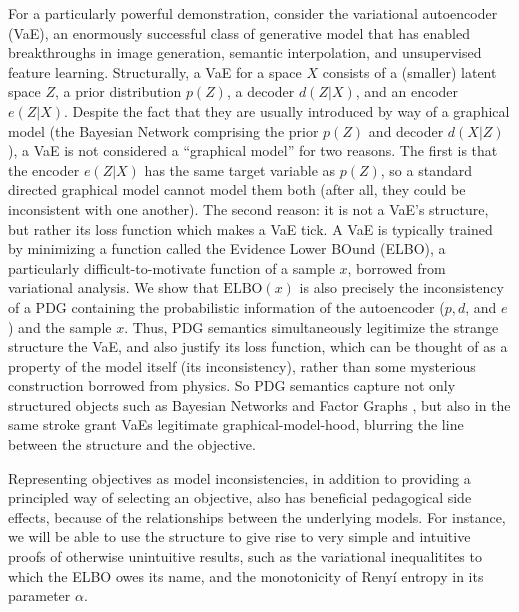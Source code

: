 \documentclass{article}
\theoremstyle{plain}
\theoremstyle{definition}
\begin{document}
For a particularly powerful demonstration, consider the variational autoencoder (VaE), an enormously successful class of generative model that has enabled breakthroughs in image generation, semantic interpolation, and unsupervised feature learning.
Structurally, a VaE for a space $X$ consists of a (smaller) latent space $Z$, a prior distribution $p(Z)$, a decoder $d(Z | X)$, and an encoder $e(Z| X)$.
Despite the fact that they are usually introduced by way of a graphical model (the Bayesian Network 
comprising the prior $p(Z)$ and decoder $d(X|Z)$), a VaE is not considered a ``graphical model'' for two reasons. 
The first is that the encoder $e(Z|X)$ has the same target variable as $p(Z)$, so a standard directed graphical model cannot model them both (after all, they could be inconsistent with one another). 
The second reason: it is not a VaE's structure, but rather its loss function which makes a VaE tick. A VaE is typically trained by minimizing a function called the Evidence Lower BOund (ELBO), a particularly difficult-to-motivate function of a sample $x$, borrowed from variational analysis. 
We show that $\mathrm{ELBO}(x)$ is also precisely the inconsistency of a PDG containing the probabilistic information of the autoencoder ($p, d$, and $e$) and the sample $x$. 
Thus, PDG semantics simultaneously legitimize the strange structure the VaE, and also justify its loss function, which can be thought of as a property of the model itself (its inconsistency), rather than some mysterious construction borrowed from physics.
So PDG semantics capture not only structured objects such as Bayesian Networks and Factor Graphs \cite{richardson2020probabilistic}, but also in the same stroke grant VaEs legitimate graphical-model-hood, blurring the line between the structure and the objective.




Representing objectives as model inconsistencies, in addition to providing a principled way of selecting an objective, also has beneficial pedagogical side effects, because of the relationships between the underlying models.
For instance, we will be able to use the structure to give rise to very simple and intuitive proofs of otherwise unintuitive results, such as the variational inequalitites to which the ELBO owes its name, and the monotonicity of Reny\'i entropy  in its parameter $\alpha$.

\end{document}
